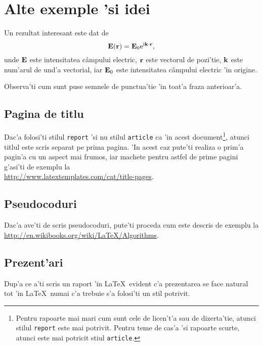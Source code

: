 \section{Alte exemple 'si idei}

Un rezultat interesant este dat de
\begin{equation}
\label{eq:camp}
\vect{E}(\vect{r}) = \vect{E}_0 \eul^{\I\vect{k}\cdot\vect{r}},  %
\end{equation}
unde $\mathbf{E}$ este intensitatea c\^ampului electric, $\mathbf{r}$ este vectorul de pozi'tie, $\mathbf{k}$ este num'arul de und'a vectorial, iar
$\mathbf{E}_0$ este intensitatea c\^ampului electric 'in origine.

Observa'ti cum sunt puse semnele de punctua'tie 'in toat'a fraza anterioar'a.

\subsection{Pagina de titlu}

Dac'a folosi'ti stilul {\tt report} 'si nu stilul {\tt article} ca 'in acest document\footnote{Pentru rapoarte mai mari cum sunt cele de licen't'a sau de dizerta'tie, atunci stilul {\tt report} este mai potrivit. Pentru teme de cas'a 'si rapoarte scurte, atunci este mai potricit stiul {\tt article}.}, atunci titlul este scris separat pe prima pagina. 
'In acest caz pute'ti realiza o prim'a pagin'a cu un aspect mai frumos, iar machete pentru astfel de prime pagini 
g'asi'ti de exemplu la \\  %
\href{http://www.latextemplates.com/cat/title-pages}{http://www.latextemplates.com/cat/title-pages}.

\subsection{Pseudocoduri}

Dac'a ave'ti de scris pseudocoduri, pute'ti proceda cum este descris de exemplu la \\
\href{http://en.wikibooks.org/wiki/LaTeX/Algorithms}{http://en.wikibooks.org/wiki/LaTeX/Algorithms}.


\subsection{Prezent'ari}

Dup'a ce a'ti scris un raport 'in \LaTeX\, evident c'a prezentarea se face natural tot 'in \LaTeX\, numai c'a trebuie s'a folosi'ti un stil potrivit.

